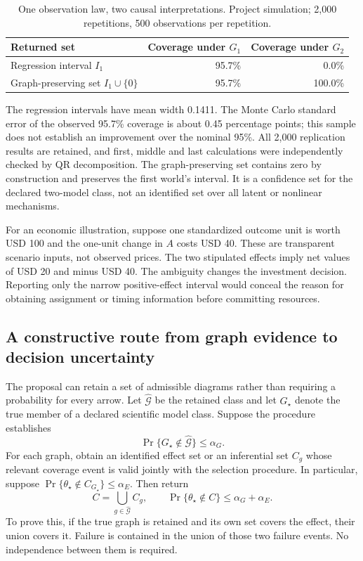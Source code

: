 \begin{table}[tbp]
\centering
\caption{One observation law, two causal interpretations. Project simulation;
 2,000 repetitions, 500 observations per repetition.}
\begin{tabular}{lrr}
\toprule
Returned set & Coverage under $G_1$ & Coverage under $G_2$\\
\midrule
Regression interval $I_1$ & 95.7\% & 0.0\%\\
Graph-preserving set $I_1\cup\{0\}$ & 95.7\% & 100.0\%\\
\bottomrule
\end{tabular}
\label{closure30:graph-coverage-table}
\end{table}

The regression intervals have mean width 0.1411. The Monte Carlo standard
error of the observed 95.7\% coverage is about 0.45 percentage points; this
sample does not establish an improvement over the nominal 95\%. All 2,000
replication results are retained, and first, middle and last calculations
were independently checked by QR decomposition. The graph-preserving set
contains zero by construction and preserves the first world's interval.
It is a confidence set for the declared two-model class, not an identified
set over all latent or nonlinear mechanisms.

For an economic illustration, suppose one standardized outcome unit is worth
USD 100 and the one-unit change in $A$ costs USD 40. These are
transparent scenario inputs, not observed prices. The two stipulated effects
imply net values of USD 20 and minus USD 40. The ambiguity changes
the investment decision. Reporting only the narrow positive-effect interval
would conceal the reason for obtaining assignment or timing information
before committing resources.

\subsection{A constructive route from graph evidence to decision uncertainty}

The proposal can retain a set of admissible diagrams rather than requiring a
probability for every arrow. Let $\widehat{\mathcal G}$ be the retained class
and let $G_\star$ denote the true member of a declared scientific model class.
Suppose the procedure establishes
\begin{equation}
 \Pr\{G_\star\notin\widehat{\mathcal G}\}\leq\alpha_G.
 \label{closure30:graph-retention-contract}
\end{equation}
For each graph, obtain an identified effect set or an inferential set
$C_g$ whose relevant coverage event is valid jointly with the selection
procedure. In particular, suppose
$\Pr\{\theta_\star\notin C_{G_\star}\}\leq\alpha_E$.
Then return
\begin{equation}
 C=\bigcup_{g\in\widehat{\mathcal G}} C_g,
 \qquad
 \Pr\{\theta_\star\notin C\}\leq\alpha_G+\alpha_E.
 \label{closure30:union-coverage}
\end{equation}
To prove this, if the true graph is retained and its own set covers the
effect, their union covers it. Failure is contained in the union of those
two failure events. No independence between them is required.

